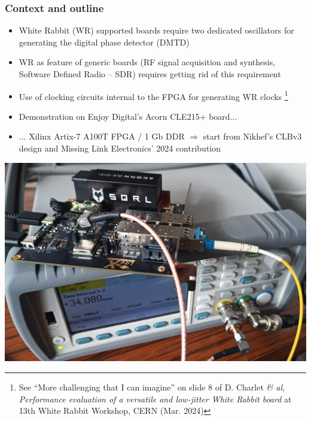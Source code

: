 \documentclass[compress,10pt,aspectratio=169]{beamer}
\begin{document}
\begin{frame}[fragile]\frametitle{Context and outline}

\vspace{0.2cm}
\begin{minipage}[t]{\linewidth}
\begin{minipage}{.49\linewidth}    
{\footnotesize
\begin{itemize}
\item White Rabbit (WR) supported boards require two dedicated oscillators for generating
the digital phase detector (DMTD)
\item WR as feature of generic boards (RF signal acquisition and synthesis, Software Defined Radio -- SDR) requires getting rid of this requirement
\item Use of clocking circuits internal to the FPGA for generating WR clocks
\footnote{See ``More challenging that I can imagine'' on slide 8 of D. Charlet {\em \& al}, {\em Performance evaluation of a versatile and low-jitter
White Rabbit board} at 13th White Rabbit Workshop, CERN (Mar. 2024)}
\item Demonstration on Enjoy Digital's Acorn CLE215+ board...
\item ... Xilinx Artix-7 A100T FPGA / 1 Gb DDR $\Rightarrow$ start from Nikhef's  CLBv3 design and Missing Link Electronics' 2024 contribution\footnotemark
\footnotemark
\end{itemize}
}
\end{minipage}
\begin{minipage}{.49\linewidth}
\includegraphics[width=\linewidth]{IMG_20250425_163316_728.jpg}
\end{minipage}
\end{minipage}
\end{frame}
\end{document}
